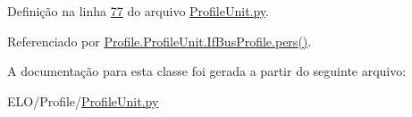 Definição na linha \hyperlink{ProfileUnit_8py_source_l00077}{77} do arquivo \hyperlink{ProfileUnit_8py_source}{Profile\-Unit.\-py}.



Referenciado por \hyperlink{classProfile_1_1ProfileUnit_1_1IfBusProfile_a996592f4b01e0540f45d042065d5a7f4}{Profile.\-Profile\-Unit.\-If\-Bus\-Profile.\-pers()}.



A documentação para esta classe foi gerada a partir do seguinte arquivo\-:\begin{DoxyCompactItemize}
\item 
E\-L\-O/\-Profile/\hyperlink{ProfileUnit_8py}{Profile\-Unit.\-py}\end{DoxyCompactItemize}

